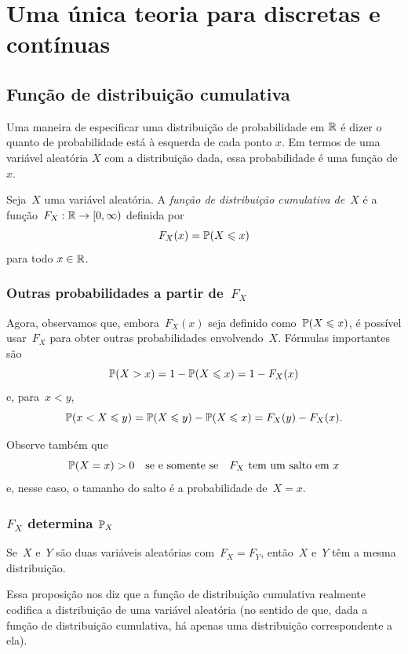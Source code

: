 \clearpage
\section{Uma única teoria para discretas e contínuas}

\subsection{Função de distribuição cumulativa}

Uma maneira de especificar uma distribuição de probabilidade em $ \mathbb{R} $ é dizer o quanto de probabilidade está à esquerda de cada ponto $ x $.
Em termos de uma variável aleatória $ X $ com a distribuição dada, essa probabilidade é uma função de $ x $.

\begin{definition}
Seja~$X$ uma variável aleatória. A \emph{função de distribuição cumulativa de~$X$} é a função~$F_X: \mathbb{R} \to [0,\infty)$ definida por
\[
F_X(x) = \mathbb{P}(X \leqslant x)
\]
para todo $ x \in \mathbb{R} $.
\end{definition}

\subsubsection*{Outras probabilidades a partir de~$F_X$}

Agora, observamos que, embora~$F_X(x)$ seja definido como~$\mathbb{P}(X \leqslant x)$, é possível usar~$F_X$ para obter outras probabilidades envolvendo~$X$. Fórmulas importantes são
\[\mathbb{P}(X > x) = 1 - \mathbb{P}(X \leqslant x) = 1 - F_X(x)\]
e, para~$x < y$,
\[\mathbb{P}(x < X \leqslant y) = \mathbb{P}(X \leqslant y) - \mathbb{P}(X \leqslant x) = F_X(y) - F_X(x).\]

Observe também que
\[\mathbb{P}(X = x) > 0 \quad \text{se e somente se}\quad F_X\text{ tem um salto em~$x$}\]
e, nesse caso, o tamanho do salto é a probabilidade de~$X = x$.

\subsubsection*{$F_X$ determina $ \mathbb{P}_X $}

\begin{proposition}
Se~$X$ e~$Y$ são duas variáveis aleatórias com~$F_X = F_Y$, então~$X$ e~$Y$ têm a mesma distribuição.
\end{proposition}
Essa proposição nos diz que a função de distribuição cumulativa realmente codifica a distribuição de uma variável aleatória (no sentido de que, dada a função de distribuição cumulativa, há apenas uma distribuição correspondente a ela).

